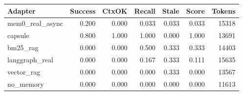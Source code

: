 \begin{tabular}{lrrrrrr}
\hline
Adapter & Success & CtxOK & Recall & Stale & Score & Tokens \\
\hline
mem0\_real\_async & 0.200 & 0.000 & 0.033 & 0.033 & 0.033 & 15318 \\
capsule & 0.800 & 1.000 & 1.000 & 0.000 & 1.000 & 13691 \\
bm25\_rag & 0.000 & 0.000 & 0.500 & 0.333 & 0.333 & 14403 \\
langgraph\_real & 0.000 & 0.000 & 0.167 & 0.333 & 0.111 & 15635 \\
vector\_rag & 0.000 & 0.000 & 0.000 & 0.333 & 0.000 & 13567 \\
no\_memory & 0.000 & 0.000 & 0.000 & 0.000 & 0.000 & 11613 \\
\hline
\end{tabular}

